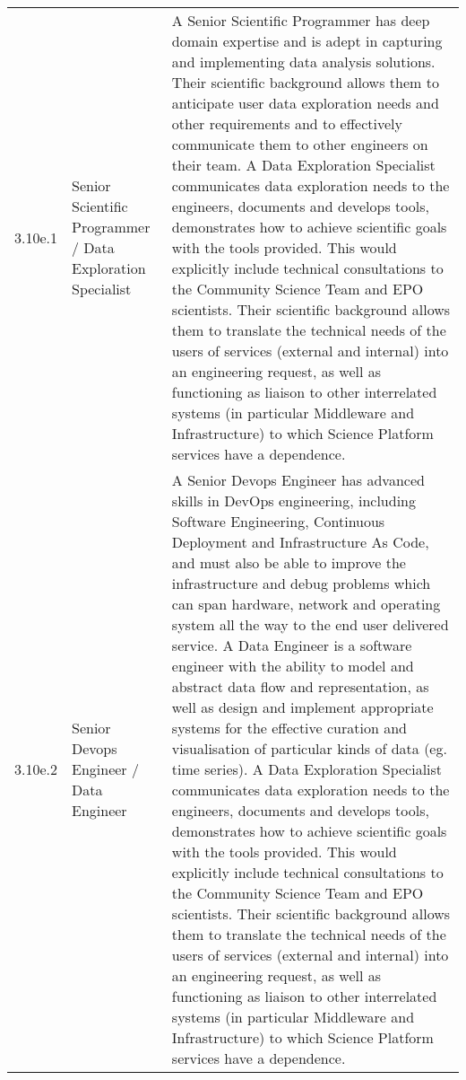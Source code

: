 \begin{longtable} {|p{}|p{}|p{}|}
{} \\ \hline
{3.10e.1}&{Senior Scientific Programmer / Data Exploration Specialist}&{A Senior Scientific Programmer has deep domain expertise and is adept in capturing and implementing data analysis solutions. Their scientific background allows them to anticipate user data exploration needs and other requirements and to effectively communicate them to other engineers on their team.
A Data Exploration Specialist communicates data exploration needs to the engineers, documents and develops tools, demonstrates how to achieve scientific goals with the tools provided. This would explicitly include technical consultations to the Community Science Team and EPO scientists. Their scientific background allows them to translate the technical needs of the users of services (external and internal) into an engineering request, as well as functioning as liaison to other interrelated systems (in particular Middleware and Infrastructure) to which Science Platform services have a dependence.
} \\ \hline
{3.10e.2}&{Senior Devops Engineer / Data Engineer}&{A Senior Devops Engineer has advanced skills in DevOps engineering, including Software Engineering, Continuous Deployment and Infrastructure As Code, and must also be able to improve the infrastructure and debug problems which can span hardware, network and operating system all the way to the end user delivered service.
A Data Engineer is a software engineer with the ability to model and abstract data flow and representation, as well as design and implement appropriate systems for the effective curation and visualisation of particular kinds of data (eg. time series). 
A Data Exploration Specialist communicates data exploration needs to the engineers, documents and develops tools, demonstrates how to achieve scientific goals with the tools provided. This would explicitly include technical consultations to the Community Science Team and EPO scientists. Their scientific background allows them to translate the technical needs of the users of services (external and internal) into an engineering request, as well as functioning as liaison to other interrelated systems (in particular Middleware and Infrastructure) to which Science Platform services have a dependence.} \\ \hline
\end{longtable} \normalsize
